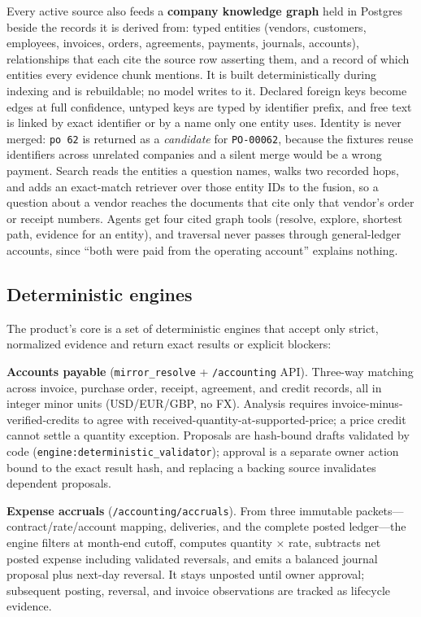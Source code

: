 \documentclass[11pt]{article}
\begin{document}
Every active source also feeds a \textbf{company knowledge graph} held in Postgres beside the records it is derived from: typed entities (vendors, customers, employees, invoices, orders, agreements, payments, journals, accounts), relationships that each cite the source row asserting them, and a record of which entities every evidence chunk mentions. It is built deterministically during indexing and is rebuildable; no model writes to it. Declared foreign keys become edges at full confidence, untyped keys are typed by identifier prefix, and free text is linked by exact identifier or by a name only one entity uses. Identity is never merged: \texttt{po 62} is returned as a \emph{candidate} for \texttt{PO-00062}, because the fixtures reuse identifiers across unrelated companies and a silent merge would be a wrong payment. Search reads the entities a question names, walks two recorded hops, and adds an exact-match retriever over those entity IDs to the fusion, so a question about a vendor reaches the documents that cite only that vendor's order or receipt numbers. Agents get four cited graph tools (resolve, explore, shortest path, evidence for an entity), and traversal never passes through general-ledger accounts, since ``both were paid from the operating account'' explains nothing.

\subsection{Deterministic engines}

The product's core is a set of deterministic engines that accept only strict, normalized evidence and return exact results or explicit blockers:

\textbf{Accounts payable} (\texttt{mirror\_resolve} + \texttt{/accounting} API). Three-way matching across invoice, purchase order, receipt, agreement, and credit records, all in integer minor units (USD/EUR/GBP, no FX). Analysis requires invoice-minus-verified-credits to agree with received-quantity-at-supported-price; a price credit cannot settle a quantity exception. Proposals are hash-bound drafts validated by code (\texttt{engine:deterministic\_validator}); approval is a separate owner action bound to the exact result hash, and replacing a backing source invalidates dependent proposals.

\textbf{Expense accruals} (\texttt{/accounting/accruals}). From three immutable packets---contract/rate/account mapping, deliveries, and the complete posted ledger---the engine filters at month-end cutoff, computes quantity $\times$ rate, subtracts net posted expense including validated reversals, and emits a balanced journal proposal plus next-day reversal. It stays unposted until owner approval; subsequent posting, reversal, and invoice observations are tracked as lifecycle evidence.
\end{document}
